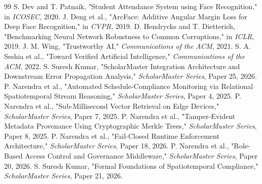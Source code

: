 \documentclass[conference]{IEEEtran}
\begin{document}
\begin{thebibliography}{99}
 S. Dev and T. Patnaik, "Student Attendance System using Face Recognition," in \textit{ICOSEC}, 2020.
 J. Deng et al., "ArcFace: Additive Angular Margin Loss for Deep Face Recognition," in \textit{CVPR}, 2019.
 D. Hendrycks and T. Dietterich, "Benchmarking Neural Network Robustness to Common Corruptions," in \textit{ICLR}, 2019.
 J. M. Wing, "Trustworthy AI," \textit{Communications of the ACM}, 2021.
 S. A. Seshia et al., "Toward Verified Artificial Intelligence," \textit{Communications of the ACM}, 2022.
 S. Suresh Kumar, "ScholarMaster Integration Architecture and Downstream Error Propagation Analysis," \textit{ScholarMaster Series}, Paper 25, 2026.
 P. Narendra et al., "Automated Schedule-Compliance Monitoring via Relational Spatiotemporal Stream Reasoning," \textit{ScholarMaster Series}, Paper 4, 2025.
 P. Narendra et al., "Sub-Millisecond Vector Retrieval on Edge Devices," \textit{ScholarMaster Series}, Paper 7, 2025.
 P. Narendra et al., "Tamper-Evident Metadata Provenance Using Cryptographic Merkle Trees," \textit{ScholarMaster Series}, Paper 8, 2025.
 P. Narendra et al., "Fail-Closed Runtime Enforcement Architecture," \textit{ScholarMaster Series}, Paper 18, 2026.
 P. Narendra et al., "Role-Based Access Control and Governance Middleware," \textit{ScholarMaster Series}, Paper 20, 2026.
 S. Suresh Kumar, "Formal Foundations of Spatiotemporal Compliance," \textit{ScholarMaster Series}, Paper 21, 2026.
\end{thebibliography}
\end{document}
